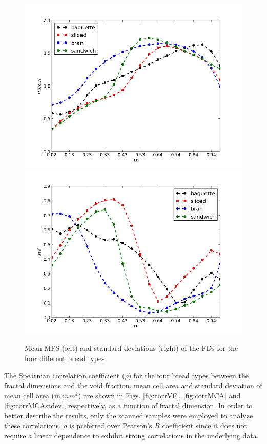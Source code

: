 \begin{figure}
\centering
\includegraphics[scale=0.4]{../images/means}
\includegraphics[scale=0.4]{../images/stdev}
\caption{Mean MFS (left) and standard deviations (right) of the FDs for the four different bread types}
\label{fig:meansMFS}
\end{figure}

The Spearman correlation coefficient ($\rho$) for the four bread types between the fractal dimensions and the void fraction, mean cell area and standard deviation of mean cell area (in $mm^{2}$) are shown in Figs. \ref{fig:corrVF}, \ref{fig:corrMCA} and \ref{fig:corrMCAstdev}, respectively, as a function of fractal dimension. In order to better describe the results, only the scanned samples were employed to analyze these correlations. $\rho$ is preferred over Pearson's $R$ coefficient since it does not require a linear dependence to exhibit strong correlations in the underlying data.

